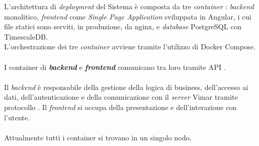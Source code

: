 L'architettura di \textit{deployment} del Sistema è composta da tre \textit{container} : \textit{backend} monolitico, \textit{frontend} come \textit{Single Page Application} sviluppata in Angular, i cui file statici sono serviti, in produzione, da nginx, e \textit{database} PostgreSQL con TimescaleDB. \\ 
L'orchestrazione dei tre \textit{container} avviene tramite l'utilizzo di Docker Compose.\\ \\
I container di \textit{\textbf{backend}} e \textit{\textbf{frontend}} comunicano tra loro tramite API . \\ \\
Il \textit{backend} è responsabile della gestione della logica di business, dell'accesso ai dati, dell'autenticazione e della comunicazione con il \textit{server}
Vimar tramite protocollo . Il \textit{frontend} si occupa 
della presentazione e dell'interazione con l'utente. \\ \\
Attualmente tutti i container si trovano in un singolo nodo.
